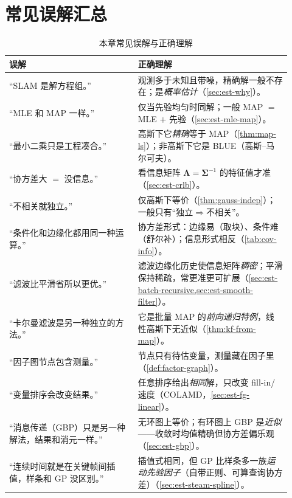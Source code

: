 \section*{常见误解汇总}
\begin{table}[H]\centering\small
\caption{本章常见误解与正确理解}
\begin{tabular}{p{0.42\linewidth}p{0.5\linewidth}}
\toprule
误解 & 正确理解 \\
\midrule
“SLAM 是解方程组。” & 观测多于未知且带噪，精确解一般不存在；是\emph{概率估计}（\cref{sec:est-why}）。 \\
“MLE 和 MAP 一样。” & 仅当先验均匀时同解；一般 MAP $=$ MLE $+$ 先验（\cref{sec:est-mle-map}）。 \\
“最小二乘只是工程凑合。” & 高斯下它\emph{精确}等于 MAP（\cref{thm:map-ls}）；非高斯下它是 BLUE（高斯–马尔可夫）。 \\
“协方差大 $=$ 没信息。” & 看信息矩阵 $\boldsymbol{\Lambda}=\boldsymbol{\Sigma}^{-1}$ 的特征值才准（\cref{sec:est-crlb}）。 \\
“不相关就独立。” & 仅高斯下等价（\cref{thm:gauss-indep}）；一般只有“独立$\Rightarrow$不相关”。 \\
“条件化和边缘化都用同一种运算。” & 协方差形式：边缘易（取块）、条件难（舒尔补）；信息形式相反（\cref{tab:cov-info}）。 \\
“滤波比平滑省所以更优。” & 滤波边缘化历史使信息矩阵\emph{稠密}；平滑保持稀疏，常更准更可扩展（\cref{sec:est-batch-recursive,sec:est-smooth-filter}）。 \\
“卡尔曼滤波是另一种独立的方法。” & 它是批量 MAP 的\emph{前向递归特例}，线性高斯下无近似（\cref{thm:kf-from-map}）。 \\
“因子图节点包含测量。” & 节点只有待估变量，测量藏在因子里（\cref{def:factor-graph}）。 \\
“变量排序会改变结果。” & 任意排序给出\emph{相同}解，只改变 fill-in/速度（COLAMD，\cref{sec:est-fg-linear}）。 \\
“消息传递（GBP）只是另一种解法，结果和消元一样。” & 无环图上等价；有环图上 GBP 是\emph{近似}——收敛时均值精确但协方差偏乐观（\cref{sec:est-gbp}）。 \\
“连续时间就是在关键帧间插值，样条和 GP 没区别。” & 插值式相同，但 GP 比样条多一族\emph{运动先验因子}（自带正则、可算查询协方差）（\cref{sec:est-steam-spline}）。 \\
\bottomrule
\end{tabular}
\end{table}


